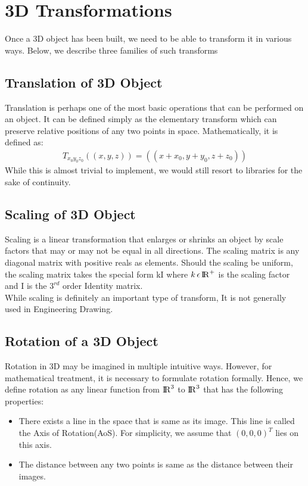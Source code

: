 \documentclass[
11pt, %
english, %
singlespacing, %
headsepline, %
]{MastersDoctoralThesis} %
\begin{document}

\mainmatter %

\pagestyle{thesis} %

\chapter{3D Transformations}
Once a 3D object has been built, we need to be able to transform it in various ways. Below, we describe three families of such transforms
\section{Translation of 3D Object}
Translation is perhaps one of the most basic operations that can be performed on an object. It can be defined simply as the elementary transform which can preserve relative positions of any two points in space.
Mathematically, it is defined as:\\
\begin{align*}
T_{x_0y_0z_0}((x, y, z)) = ((x + x_0, y + y_0, z + z_0))
\end{align*}
While this is almost trivial to implement, we would still resort to libraries for the sake of continuity.

\section{Scaling of 3D Object}
Scaling is a linear transformation that enlarges or shrinks an object by scale factors that may or may not be equal in all directions. The scaling matrix is any diagonal matrix with positive reals as elements. Should the scaling be uniform, the scaling matrix takes the special form kI where $k\,\epsilon   \,{\rm I\!R}^+$ is the scaling factor and I is the $3^{rd}$ order Identity matrix.\\
While scaling is definitely an important type of transform, It is not generally used in Engineering Drawing.

\section{Rotation of a 3D Object}
Rotation in 3D may be imagined in multiple intuitive ways. However, for mathematical treatment, it is necessary to formulate rotation formally. Hence, we define rotation as any linear function from ${\rm I\!R}^3$ to $ {\rm I\!R}^3$ that has the following properties:
\begin{itemize}
  \item There exists a line in the space that is same as its image. This line is called the Axis of Rotation(AoS). For simplicity, we assume that $(0,0,0)^T$ lies on this axis.
  \item The distance between any two points is same as the distance between their images.
\end{itemize}
\end{document}
